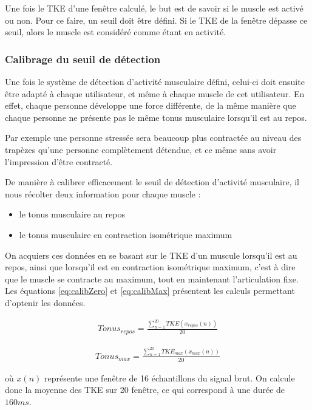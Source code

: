 \documentclass[letterpaper, twoside, 12pt, memoire, creativecommons, hyperref]{thETS}
\begin{document}
Une fois le TKE d'une fenêtre calculé, le but est de savoir si le muscle est activé ou non. Pour ce faire, un seuil doit être défini. Si le TKE de la fenêtre dépasse ce seuil, alors le muscle est considéré comme étant en activité.

\subsubsection{Calibrage du seuil de détection}

Une fois le système de détection d'activité musculaire défini, celui-ci doit ensuite être adapté à chaque utilisateur, et même à chaque muscle de cet utilisateur. En effet, chaque personne développe une force différente, de la même manière que chaque personne ne présente pas le même tonus musculaire lorsqu'il est au repos. 

Par exemple une personne stressée sera beaucoup plus contractée au niveau des trapèzes qu'une personne complètement détendue, et ce même sans avoir l'impression d'être contracté.

De manière à calibrer efficacement le seuil de détection d'activité musculaire, il nous récolter deux information pour chaque muscle : 

\begin{itemize}
 \item le tonus musculaire au repos
 \item le tonus musculaire en contraction isométrique maximum
\end{itemize}

On acquiers ces données en se basant sur le TKE d'un muscule lorsqu'il est au repos, ainsi que lorsqu'il est en contraction isométrique maximum, c'est à dire que le muscle se contracte au maximum, tout en maintenant l'articulation fixe. Les équations \ref{eq:calibZero} et \ref{eq:calibMax} présentent les calculs permettant d'optenir les données.

\begin{align}\label{eq:calibZero}
   Tonus_{repos} = \frac{\sum_{n=1}^{20}TKE(x_{repos}(n))}{20} 
\end{align}

\begin{align}\label{eq:calibMax}
   Tonus_{max} = \frac{\sum_{n=1}^{20}TKE_{max}(x_{max}(n))}{20} 
\end{align}

où $x(n)$ représente une fenêtre de 16 échantillons du signal brut. On calcule donc la moyenne des TKE sur 20 fenêtre, ce qui correspond à une durée de $160ms$. 
\end{document}

